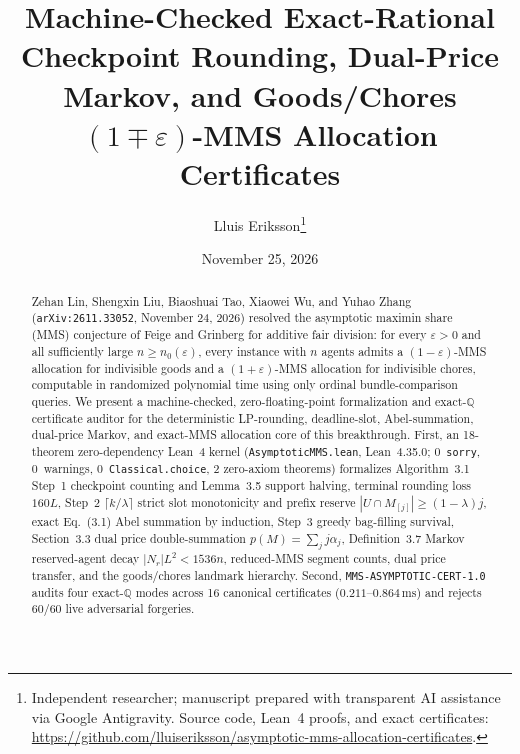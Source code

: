 \documentclass[11pt,twocolumn]{article}
\title{\textbf{Machine-Checked Exact-Rational Checkpoint Rounding, Dual-Price Markov, and Goods/Chores $(1 \mp \varepsilon)$-MMS Allocation Certificates}}
\author{Lluis Eriksson\thanks{Independent researcher; manuscript prepared with transparent AI assistance via Google Antigravity. Source code, Lean~4 proofs, and exact certificates: \url{https://github.com/lluiseriksson/asymptotic-mms-allocation-certificates}.}}
\date{November 25, 2026}
\newcommand{\QQ}{\mathbb{Q}}
\begin{document}
\sloppy
\maketitle

\begin{abstract}
Zehan Lin, Shengxin Liu, Biaoshuai Tao, Xiaowei Wu, and Yuhao Zhang (\texttt{arXiv:2611.33052}, November 24, 2026) resolved the asymptotic maximin share (MMS) conjecture of Feige and Grinberg for additive fair division: for every $\varepsilon > 0$ and all sufficiently large $n \ge n_0(\varepsilon)$, every instance with $n$ agents admits a $(1 - \varepsilon)$-MMS allocation for indivisible goods and a $(1 + \varepsilon)$-MMS allocation for indivisible chores, computable in randomized polynomial time using only ordinal bundle-comparison queries. We present a machine-checked, zero-floating-point formalization and exact-$\QQ$ certificate auditor for the deterministic LP-rounding, deadline-slot, Abel-summation, dual-price Markov, and exact-MMS allocation core of this breakthrough. First, an 18-theorem zero-dependency Lean~4 kernel (\texttt{AsymptoticMMS.lean}, Lean~4.35.0; 0~\texttt{sorry}, 0~warnings, 0~\texttt{Classical.choice}, 2 zero-axiom theorems) formalizes Algorithm~3.1 Step~1 checkpoint counting and Lemma~3.5 support halving, terminal rounding loss $160L$, Step~2 $\lceil k/\lambda\rceil$ strict slot monotonicity and prefix reserve $|U \cap M_{[j]}| \ge (1-\lambda)j$, exact Eq.~(3.1) Abel summation by induction, Step~3 greedy bag-filling survival, Section~3.3 dual price double-summation $p(M) = \sum_j j\alpha_j$, Definition~3.7 Markov reserved-agent decay $|N_r| L^2 < 1536 n$, reduced-MMS segment counts, dual price transfer, and the goods/chores landmark hierarchy. Second, \texttt{MMS-ASYMPTOTIC-CERT-1.0} audits four exact-$\QQ$ modes across 16 canonical certificates ($0.211$--$0.864\,\mathrm{ms}$) and rejects 60/60 live adversarial forgeries.
\end{abstract}
\end{document}
